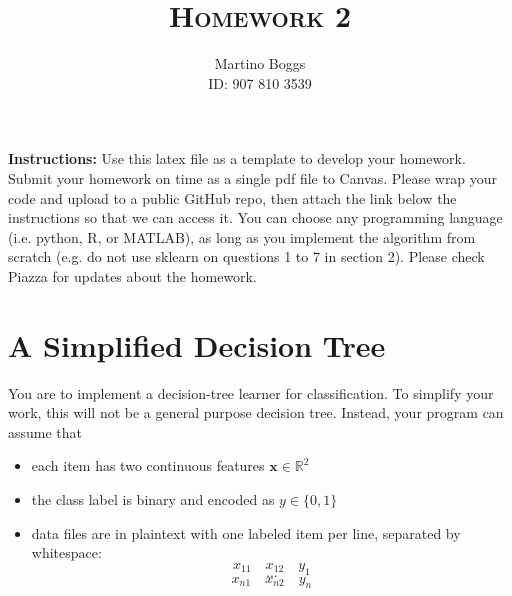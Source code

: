\documentclass[a4paper]{article}
\title{\textsc{Homework 2}} %
\author{
Martino Boggs \\
ID: 907 810 3539
}
\date{}
\theoremstyle{definition}
\newcommand{\RR}{\mathbb{R}}
\def\x{\mathbf x}
\begin{document}
\maketitle 


\textbf{Instructions:} 
Use this latex file as a template to develop your homework. Submit your homework on time as a single pdf file to Canvas. Please wrap your code and upload to a public GitHub repo, then attach the link below the instructions so that we can access it. You can choose any programming language (i.e. python, R, or MATLAB), as long as you implement the algorithm from scratch (e.g. do not use sklearn on questions 1 to 7 in section 2). Please check Piazza for updates about the homework.

\section{A Simplified Decision Tree}
You are to implement a decision-tree learner for classification.
To simplify your work, this will not be a general purpose decision tree.  Instead, your program can assume that
\begin{itemize}
\item each item has two continuous features $\x \in \RR^2$
\item the class label is binary and encoded as $y \in \{0,1\}$
\item data files are in plaintext with one labeled item per line, separated by whitespace:
$$x_{11} \quad x_{12} \quad y_1$$
$$...$$
$$x_{n1} \quad x_{n2} \quad y_n$$
\end{itemize}
\end{document}
